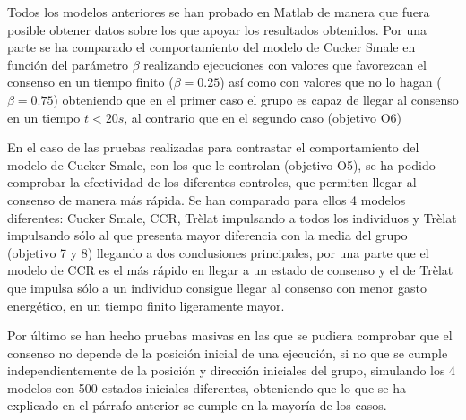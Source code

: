 Todos los modelos anteriores se han probado en Matlab de manera que fuera posible obtener datos sobre los que apoyar los resultados obtenidos. Por una parte se ha comparado el comportamiento del modelo de Cucker Smale en función del parámetro $\beta$ realizando ejecuciones con valores que favorezcan el consenso en un tiempo finito ($\beta=0.25$) así como con valores que no lo hagan ($\beta=0.75$) obteniendo que en el primer caso el grupo es capaz de llegar al consenso en un tiempo $t<20s$, al contrario que en el segundo caso (objetivo O6)

En el caso de las pruebas realizadas para contrastar el comportamiento del modelo de Cucker Smale, con los que le controlan (objetivo O5), se ha podido comprobar la efectividad de los diferentes controles, que permiten llegar al consenso de manera más rápida. Se han comparado para ellos 4 modelos diferentes: Cucker Smale, CCR, Trèlat impulsando a todos los individuos y Trèlat impulsando sólo al que presenta mayor diferencia con la media del grupo (objetivo 7 y 8) llegando a dos conclusiones principales, por una parte que el modelo de CCR es el más rápido en llegar a un estado de consenso y el de Trèlat que impulsa sólo a un individuo consigue llegar al consenso con menor gasto energético, en un tiempo finito ligeramente mayor. 

Por último se han hecho pruebas masivas en las que se pudiera comprobar que el consenso no depende de la posición inicial de una ejecución, si no que se cumple independientemente de la posición y dirección iniciales del grupo, simulando los 4 modelos con 500 estados iniciales diferentes, obteniendo que lo que se ha explicado en el párrafo anterior se cumple en la mayoría de los casos.



